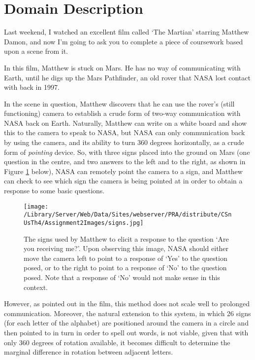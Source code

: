 \documentclass[11pt]{article}
\begin{document}
\section{Domain Description}

Last weekend, I watched an excellent film called `The Martian' starring Matthew Damon, and now I'm going to ask you to complete a piece of coursework based upon a scene from it. 

In this film, Matthew is stuck on Mars. He has no way of communicating with Earth, until he digs up the Mars Pathfinder, an old rover that NASA lost contact with back in 1997.  

In the scene in question, Matthew discovers that he can use the rover's (still functioning) camera to establish a crude form of two-way communication with NASA back on Earth. Naturally, Matthew can write on a white board and show this to the camera to speak to NASA, but NASA can only communication back by using the camera, and its ability to turn 360 degrees horizontally, as a crude form of \emph{pointing} device. So, with three signs placed into the ground on Mars (one question in the centre, and two answers to the left and to the right, as shown in Figure \ref{fig:signs} below),  NASA can remotely point the camera to a sign, and Matthew can check to see which sign the camera is being pointed at in order to obtain a response to some basic questions.

\begin{figure}[htbp]
\begin{center}
\texttt{[image: /Library/Server/Web/Data/Sites/webserver/PRA/distribute/CSnUsTh4/Assignment2Images/signs.jpg]}
\caption{The signs used by Matthew to elicit a response to the question `Are you receiving me?'. Upon observing this image, NASA should either move the camera left to point to a response of `Yes' to the question posed, or to the right to point to a response of `No' to the question posed. Note that a response of `No' would not make sense in this context.}
\label{fig:signs}
\end{center}
\end{figure}


However, as pointed out in the film, this method does not scale well to prolonged  communication. Moreover, the natural extension to this system, in which 26 signs (for each letter of the alphabet) are positioned around the camera in a circle and then pointed to in turn in order to spell out words, is not viable, given that with only 360 degrees of rotation available, it becomes difficult to determine the marginal difference in rotation between adjacent letters.
\end{document}
